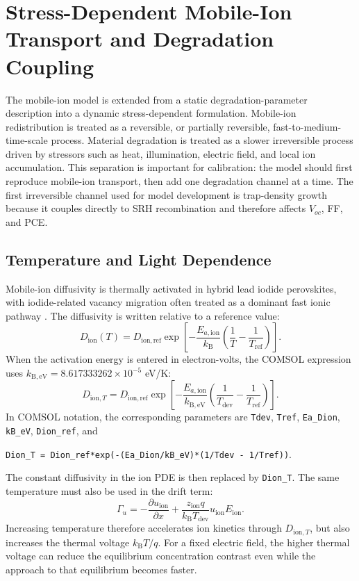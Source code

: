 \section{Stress-Dependent Mobile-Ion Transport and Degradation Coupling}

The mobile-ion model is extended from a static degradation-parameter
description into a dynamic stress-dependent formulation. Mobile-ion
redistribution is treated as a reversible, or partially reversible,
fast-to-medium-time-scale process. Material degradation is treated as a slower
irreversible process driven by stressors such as heat, illumination, electric
field, and local ion accumulation. This separation is important for calibration:
the model should first reproduce mobile-ion transport, then add one
degradation channel at a time. The first irreversible channel used for model
development is trap-density growth because it couples directly to SRH
recombination and therefore affects $V_{oc}$, FF, and PCE.

\subsection{Temperature and Light Dependence}

Mobile-ion diffusivity is thermally activated in hybrid lead iodide
perovskites, with iodide-related vacancy migration often treated as a dominant
fast ionic pathway \cite{Eames_2015,Futscher_2019}. The diffusivity is written
relative to a reference value:
\begin{equation}
D_{\mathrm{ion}}(T)
=D_{\mathrm{ion,ref}}
\exp\left[
-\frac{E_{a,\mathrm{ion}}}{k_{\mathrm{B}}}
\left(\frac{1}{T}-\frac{1}{T_{\mathrm{ref}}}\right)
\right].
\end{equation}
When the activation energy is entered in electron-volts, the COMSOL expression
uses $k_{\mathrm{B,eV}}=8.617333262\times10^{-5}$ eV/K:
\begin{equation}
D_{\mathrm{ion},T}
=D_{\mathrm{ion,ref}}
\exp\left[
-\frac{E_{a,\mathrm{ion}}}{k_{\mathrm{B,eV}}}
\left(\frac{1}{T_{\mathrm{dev}}}-\frac{1}{T_{\mathrm{ref}}}\right)
\right].
\label{eq:dion_temperature}
\end{equation}
In COMSOL notation, the corresponding parameters are
\texttt{Tdev}, \texttt{Tref}, \texttt{Ea\_Dion}, \texttt{kB\_eV},
\texttt{Dion\_ref}, and
\begin{center}
\texttt{Dion\_T = Dion\_ref*exp(-(Ea\_Dion/kB\_eV)*(1/Tdev - 1/Tref))}.
\end{center}
The constant diffusivity in the ion PDE is then replaced by
\texttt{Dion\_T}. The same temperature must also be used in the drift term:
\begin{equation}
\Gamma_u
=-\frac{\partial u_{\mathrm{ion}}}{\partial x}
+\frac{z_{\mathrm{ion}}q}{k_{\mathrm{B}}T_{\mathrm{dev}}}
u_{\mathrm{ion}}E_{\mathrm{ion}}.
\label{eq:gamma_tdev}
\end{equation}
Increasing temperature therefore accelerates ion kinetics through
$D_{\mathrm{ion},T}$, but also increases the thermal voltage
$k_{\mathrm{B}}T/q$. For a fixed electric field, the higher thermal voltage
can reduce the equilibrium concentration contrast even while the approach to
that equilibrium becomes faster.

